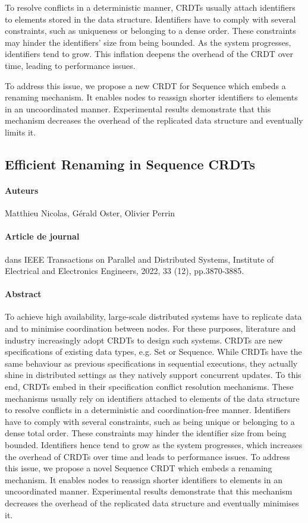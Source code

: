 To resolve conflicts in a deterministic manner, \acp{CRDT} usually attach identifiers to elements stored in the data structure.
Identifiers have to comply with several constraints, such as uniqueness or belonging to a dense order.
These constraints may hinder the identifiers’ size from being bounded.
As the system progresses, identifiers tend to grow.
This inflation deepens the overhead of the \ac{CRDT} over time, leading to performance issues.

To address this issue, we propose a new CRDT for Sequence which embeds a renaming mechanism.
It enables nodes to reassign shorter identifiers to elements in an uncoordinated manner.
Experimental results demonstrate that this mechanism decreases the overhead of the replicated data structure and eventually limits it.

\subsection*{Efficient Renaming in Sequence CRDTs \cite{2022-rls-tpds-nicolas}}

\paragraph{Auteurs} Matthieu Nicolas, Gérald Oster, Olivier Perrin

\paragraph{Article de journal} dans IEEE Transactions on Parallel and Distributed Systems, Institute of Electrical and Electronics Engineers, 2022, 33 (12), pp.3870-3885.

\paragraph{Abstract}
To achieve high availability, large-scale distributed systems have to replicate data and to minimise coordination between nodes.
For these purposes, literature and industry increasingly adopt \acfp{CRDT} to design such systems.
\acp{CRDT} are new specifications of existing data types, e.g. Set or Sequence.
While \acp{CRDT} have the same behaviour as previous specifications in sequential executions, they actually shine in distributed settings as they natively support concurrent updates.
To this end, \acp{CRDT} embed in their specification conflict resolution mechanisms.
These mechanisms usually rely on identifiers attached to elements of the data structure to resolve conflicts in a deterministic and coordination-free manner.
Identifiers have to comply with several constraints, such as being unique or belonging to a dense total order.
These constraints may hinder the identifier size from being bounded.
Identifiers hence tend to grow as the system progresses, which increases the overhead of \acp{CRDT} over time and leads to performance issues.
To address this issue, we propose a novel Sequence \ac{CRDT} which embeds a renaming mechanism.
It enables nodes to reassign shorter identifiers to elements in an uncoordinated manner.
Experimental results demonstrate that this mechanism decreases the overhead of the replicated data structure and eventually minimises it.
